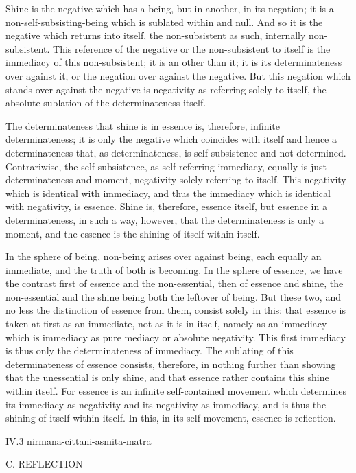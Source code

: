 Shine is the negative which has a being,
but in another, in its negation;
it is a non-self-subsisting-being
which is sublated within and null.
And so it is the negative which returns into itself,
the non-subsistent as such, internally non-subsistent.
This reference of the negative or
the non-subsistent to itself is
the immediacy of this non-subsistent;
it is an other than it;
it is its determinateness over against it,
or the negation over against the negative.
But this negation which stands over against the negative is
negativity as referring solely to itself,
the absolute sublation of the determinateness itself.

The determinateness that shine is in essence is,
therefore, infinite determinateness;
it is only the negative which coincides with itself
and hence a determinateness that, as determinateness,
is self-subsistence and not determined.
Contrariwise, the self-subsistence, as self-referring immediacy,
equally is just determinateness and moment,
negativity solely referring to itself.
This negativity which is identical with immediacy,
and thus the immediacy which is identical with negativity, is essence.
Shine is, therefore, essence itself,
but essence in a determinateness, in such a way, however,
that the determinateness is only a moment,
and the essence is the shining of itself within itself.

In the sphere of being, non-being arises over against being,
each equally an immediate, and the truth of both is becoming.
In the sphere of essence, we have the contrast
first of essence and the non-essential,
then of essence and shine,
the non-essential and the shine
being both the leftover of being.
But these two, and no less the
distinction of essence from them,
consist solely in this:
that essence is taken at first as an immediate,
not as it is in itself,
namely as an immediacy which is immediacy
as pure mediacy or absolute negativity.
This first immediacy is thus only the determinateness of immediacy.
The sublating of this determinateness of essence consists, therefore,
in nothing further than showing that the unessential is only shine,
and that essence rather contains this shine within itself.
For essence is an infinite self-contained movement
which determines its immediacy as negativity
and its negativity as immediacy,
and is thus the shining of itself within itself.
In this, in its self-movement,
essence is reflection.

IV.3
nirmana-cittani-asmita-matra

C. REFLECTION

